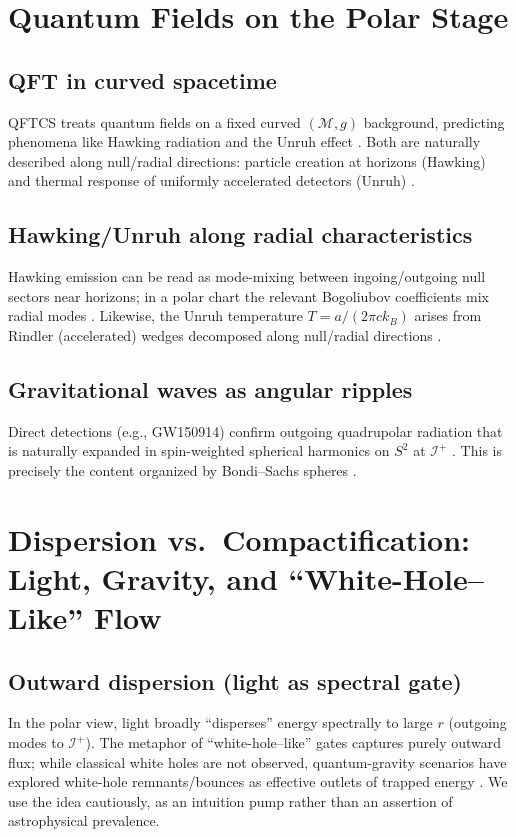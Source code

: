 \documentclass[12pt]{article}
\newcommand{\M}{\mathcal{M}}
\newcommand{\g}{g}
\newcommand{\Iplus}{\mathcal{I}^+}
\begin{document}
\section{Quantum Fields on the Polar Stage}
\subsection{QFT in curved spacetime}
QFTCS treats quantum fields on a fixed curved $(\M,\g)$ background, predicting phenomena like Hawking radiation and the Unruh effect \citep{BirrellDavies1982,ParkerToms2009}. Both are naturally described along null/radial directions: particle creation at horizons (Hawking) \citep{Hawking1975} and thermal response of uniformly accelerated detectors (Unruh) \citep{Unruh1976}.

\subsection{Hawking/Unruh along radial characteristics}
Hawking emission can be read as mode-mixing between ingoing/outgoing null sectors near horizons; in a polar chart the relevant Bogoliubov coefficients mix radial modes \citep{Hawking1975,BirrellDavies1982}. Likewise, the Unruh temperature $T=a/(2\pi c k_B)$ arises from Rindler (accelerated) wedges decomposed along null/radial directions \citep{Unruh1976,BirrellDavies1982}.

\subsection{Gravitational waves as angular ripples}
Direct detections (e.g., GW150914) confirm outgoing quadrupolar radiation that is naturally expanded in spin-weighted spherical harmonics on $S^2$ at $\Iplus$ \citep{Abbott2016GW}. This is precisely the content organized by Bondi–Sachs spheres \citep{Bondi1962,Sachs1962}.

\section{Dispersion vs.\ Compactification: Light, Gravity, and ``White-Hole–Like'' Flow}
\subsection{Outward dispersion (light as spectral gate)}
In the polar view, light broadly ``disperses'' energy spectrally to large $r$ (outgoing modes to $\Iplus$). The metaphor of ``white-hole–like'' gates captures purely outward flux; while classical white holes are not observed, quantum-gravity scenarios have explored white-hole remnants/bounces as effective outlets of trapped energy \citep{deLorenzo2016}. We use the idea cautiously, as an intuition pump rather than an assertion of astrophysical prevalence.
\end{document}
